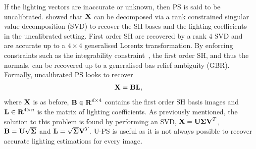 If the lighting vectors are inaccurate or unknown, then PS is said to be
uncalibrated. \citet{basri2007photometric} showed that $\boldsymbol{\mathbf{X}}$ can
be decomposed via a rank constrained singular value decomposition (SVD) to
recover the SH bases and the lighting coefficients in the uncalibrated setting.
First order SH are recovered by a rank 4 SVD and are accurate up to a $4 \times 4$ 
generalised Lorentz transformation. By enforcing constraints such as the
integrability constraint~\cite{frankot1988method}, the first order SH, and thus the
normals, can be recovered up to a generalised bas relief ambiguity (GBR).
Formally, uncalibrated PS looks to recover
\begin{equation}\label{eq:uncalibrated_ps}
    \boldsymbol{\mathbf{X}} = \boldsymbol{\mathbf{B}} \boldsymbol{\mathbf{L}},
\end{equation}
where $\boldsymbol{\mathbf{X}}$ is as before, $\boldsymbol{\mathbf{B}} \in \boldsymbol{\mathbf{R}}^{d \times 4}$ 
contains the first order SH basis images and
$\boldsymbol{\mathbf{L}} \in \boldsymbol{\mathbf{R}}^{4 \times n}$ is the matrix of lighting coefficients. 
As previously mentioned, the solution to this problem is found by performing an
SVD,
$\boldsymbol{\mathbf{X}} =\nobreak \boldsymbol{\mathbf{U}} \boldsymbol{\mathbf{\Sigma}} \boldsymbol{\mathbf{V}}^T$, $\boldsymbol{\mathbf{B}} = \boldsymbol{\mathbf{U}} \sqrt{\boldsymbol{\mathbf{\Sigma}}}$
and $\boldsymbol{\mathbf{L}} = \sqrt{\boldsymbol{\mathbf{\Sigma}}} \boldsymbol{\mathbf{V}}^T$. 
U-PS is useful as it is not always possible to recover accurate 
lighting estimations for every image.
